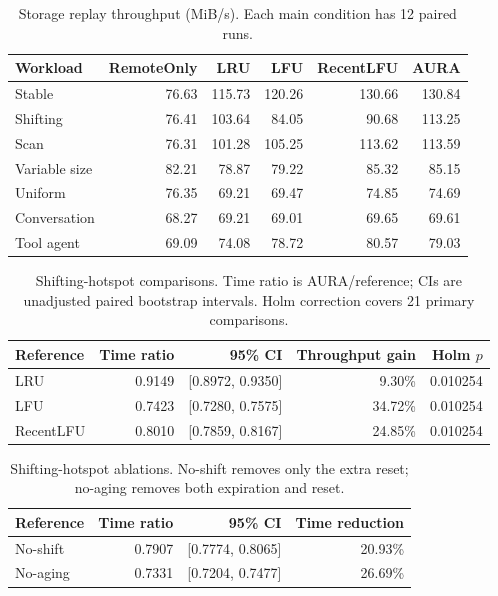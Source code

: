 \begin{table}[t]
\centering
\small
\caption{Storage replay throughput (MiB/s). Each main condition has 12 paired runs.}
\begin{tabular}{lrrrrr}
\toprule
Workload & RemoteOnly & LRU & LFU & RecentLFU & AURA \\
\midrule
Stable & 76.63 & 115.73 & 120.26 & 130.66 & 130.84 \\
Shifting & 76.41 & 103.64 & 84.05 & 90.68 & 113.25 \\
Scan & 76.31 & 101.28 & 105.25 & 113.62 & 113.59 \\
Variable size & 82.21 & 78.87 & 79.22 & 85.32 & 85.15 \\
Uniform & 76.35 & 69.21 & 69.47 & 74.85 & 74.69 \\
Conversation & 68.27 & 69.21 & 69.01 & 69.65 & 69.61 \\
Tool agent & 69.09 & 74.08 & 78.72 & 80.57 & 79.03 \\
\bottomrule
\end{tabular}
\end{table}

\begin{table}[t]
\centering
\small
\caption{Shifting-hotspot comparisons. Time ratio is AURA/reference; CIs are unadjusted paired bootstrap intervals. Holm correction covers 21 primary comparisons.}
\begin{tabular}{lrrrr}
\toprule
Reference & Time ratio & 95\% CI & Throughput gain & Holm $p$ \\
\midrule
LRU & 0.9149 & [0.8972, 0.9350] & 9.30\% & 0.010254 \\
LFU & 0.7423 & [0.7280, 0.7575] & 34.72\% & 0.010254 \\
RecentLFU & 0.8010 & [0.7859, 0.8167] & 24.85\% & 0.010254 \\
\bottomrule
\end{tabular}
\end{table}

\begin{table}[t]
\centering
\small
\caption{Shifting-hotspot ablations. No-shift removes only the extra reset; no-aging removes both expiration and reset.}
\begin{tabular}{lrrr}
\toprule
Reference & Time ratio & 95\% CI & Time reduction \\
\midrule
No-shift & 0.7907 & [0.7774, 0.8065] & 20.93\% \\
No-aging & 0.7331 & [0.7204, 0.7477] & 26.69\% \\
\bottomrule
\end{tabular}
\end{table}
